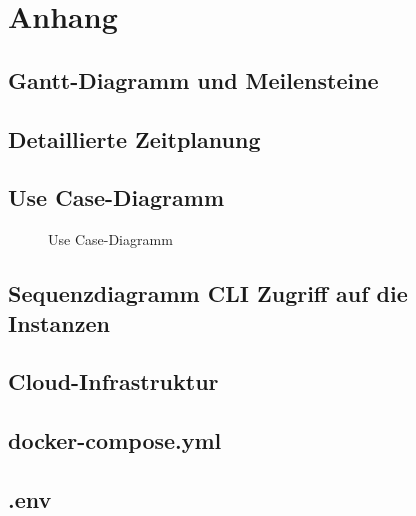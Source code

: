 \section{Anhang}
\label{sec:Anhang}
\subsection{Gantt-Diagramm und Meilensteine}
\label{app:Gantt}
\clearpage

\subsection{Detaillierte Zeitplanung}
\label{app:Zeitplanung}
\clearpage

\subsection{Use Case-Diagramm}
\label{app:UseCase}
\begin{figure}[htb]
\centering
{}
\caption{Use Case-Diagramm}
\end{figure}
\clearpage

\subsection{Sequenzdiagramm CLI Zugriff auf die Instanzen}
\label{app:Sequenzdiagramm CLI Zugriff auf die Instanzen}

\subsection{Cloud-Infrastruktur}
\label{app:Cloud-Infrastruktur}

\subsection{docker-compose.yml}
\label{app:docker-compose.yml}

\subsection{.env}
\label{app:dotenv}

